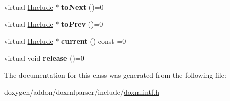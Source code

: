 \begin{DoxyCompactItemize}
virtual \mbox{\hyperlink{class_i_include}{I\+Include}} $\ast$ {\bfseries to\+Next} ()=0
\item 
\mbox{\label{class_i_include_iterator_a090fd6435c480714efe41c2719bb7f7c}} 
virtual \mbox{\hyperlink{class_i_include}{I\+Include}} $\ast$ {\bfseries to\+Prev} ()=0
\item 
\mbox{\label{class_i_include_iterator_af36048d03e8207b0598e8475d519d818}} 
virtual \mbox{\hyperlink{class_i_include}{I\+Include}} $\ast$ {\bfseries current} () const =0
\item 
\mbox{\label{class_i_include_iterator_a365e63926f161a3e2064cc86152c0329}} 
virtual void {\bfseries release} ()=0
\end{DoxyCompactItemize}


The documentation for this class was generated from the following file\+:\begin{DoxyCompactItemize}
\item 
doxygen/addon/doxmlparser/include/\mbox{\hyperlink{include_2doxmlintf_8h}{doxmlintf.\+h}}\end{DoxyCompactItemize}
